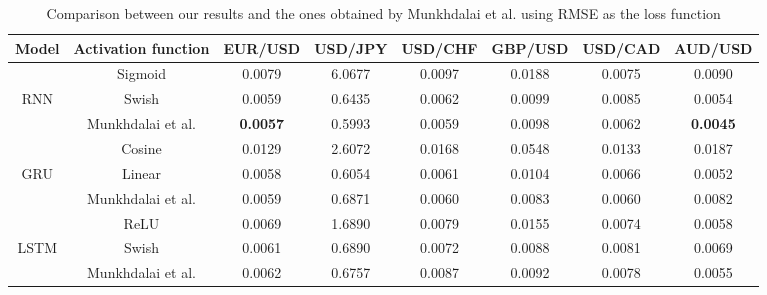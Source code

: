 \documentclass{ieeeaccess}
\begin{document}
\begin{table}[t]
  \caption{Comparison between our results and the ones obtained by Munkhdalai et al. using RMSE as the loss function}
  \scriptsize
  \centering
  \begin{tabular*}{0.9\textwidth}{c @{\extracolsep{\fill}} ccccccc}
    \hline
    \textbf{Model} & \textbf{Activation function} & \textbf{EUR/USD} & \textbf{USD/JPY} & \textbf{USD/CHF} & \textbf{GBP/USD} & \textbf{USD/CAD} & \textbf{AUD/USD} \\
    \hline

           & Sigmoid & 0.0079 & 6.0677 & 0.0097 & 0.0188 & 0.0075 & 0.0090 \\
    RNN    & Swish & 0.0059 & 0.6435 & 0.0062 & 0.0099 & 0.0085 & 0.0054 \\
           & Munkhdalai et al. & \textbf{0.0057} & 0.5993 & 0.0059 & 0.0098 & 0.0062 & \textbf{0.0045} \\

    \hline

           & Cosine & 0.0129 & 2.6072 & 0.0168 & 0.0548 & 0.0133 & 0.0187 \\
    GRU    & Linear & 0.0058 & 0.6054 & 0.0061 & 0.0104 & 0.0066 & 0.0052 \\
           & Munkhdalai et al. & 0.0059 & 0.6871 & 0.0060 & 0.0083 & 0.0060 & 0.0082 \\

    \hline

           & ReLU & 0.0069 & 1.6890 & 0.0079 & 0.0155 & 0.0074 & 0.0058 \\
    LSTM   & Swish & 0.0061 & 0.6890 & 0.0072 & 0.0088 & 0.0081 & 0.0069 \\
           & Munkhdalai et al. & 0.0062 & 0.6757 & 0.0087 & 0.0092 & 0.0078 & 0.0055 \\
    
    \hline


\end{tabular*}
\end{table}
\end{document}
